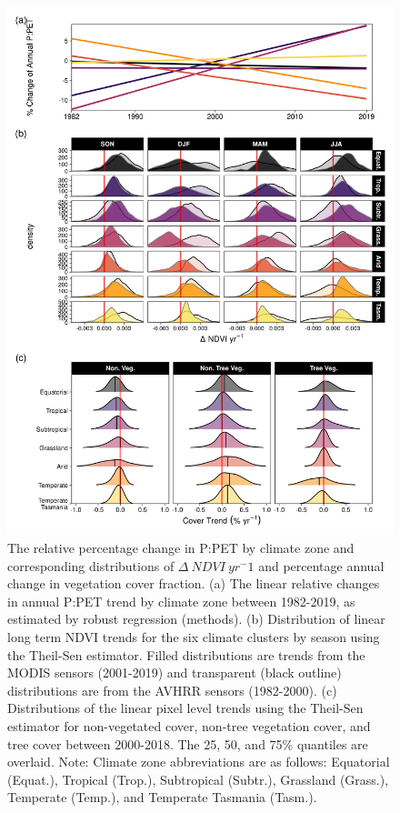 \documentclass[gc, manuscript]{copernicus}
\begin{document}
\clearpage 
\begin{figure}
\includegraphics[width=12cm]{../../figures/Fig8_PPET_change_ThielSen_VCF} \caption{The relative percentage change in P:PET by climate zone and corresponding distributions of $\Delta~NDVI~yr^-1$ and percentage annual change in vegetation cover fraction. (a) The linear relative changes in annual P:PET trend by climate zone between 1982-2019, as estimated by robust regression (methods). (b) Distribution of linear long term NDVI trends for the six climate clusters by season using the Theil-Sen estimator. Filled distributions are trends from the MODIS sensors (2001-2019) and transparent (black outline) distributions are from the AVHRR sensors (1982-2000). (c) Distributions of the linear pixel level trends using the Theil-Sen estimator for non-vegetated cover, non-tree vegetation cover, and tree cover between 2000-2018. The 25, 50, and 75\% quantiles are overlaid. \newline Note: Climate zone abbreviations are as follows: Equatorial (Equat.), Tropical (Trop.), Subtropical (Subtr.), Grassland (Grass.), Temperate (Temp.), and Temperate Tasmania (Tasm.).}\label{fig:unnamed-chunk-7}
\end{figure}
\clearpage
\end{document}
